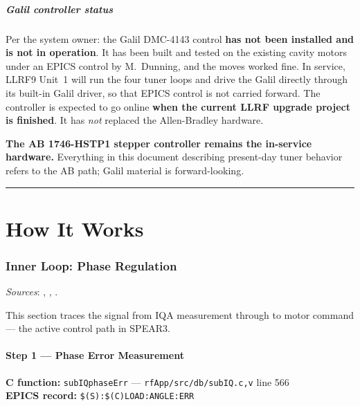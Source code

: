 \subsubsection{Galil controller status}\label{sec:galil-status}

\begin{warnbox}
Per the system owner: the Galil DMC-4143 control \textbf{has not been installed and is not in operation}. It has been built and tested on the existing cavity motors under an EPICS control by M.~Dunning, and the moves worked fine. In service, LLRF9 Unit~1 will run the four tuner loops and drive the Galil directly through its built-in Galil driver, so that EPICS control is not carried forward. The controller is expected to go online \textbf{when the current LLRF upgrade project is finished}. It has \emph{not} replaced the Allen-Bradley hardware.

\textbf{The AB 1746-HSTP1 stepper controller remains the in-service hardware.} Everything in this document describing present-day tuner behavior refers to the AB path; Galil material is forward-looking.
\end{warnbox}

\begin{center}\rule{0.5\linewidth}{0.5pt}\end{center}

\part{How It Works}

\section{Inner Loop: Phase Regulation}\label{sec:inner-loop}

\emph{Sources}: , , .


This section traces the signal from IQA measurement through to motor command --- the active control path in SPEAR3.

\subsection{Step 1 --- Phase Error Measurement}\label{sec:inner-step1}


\textbf{C function:} \texttt{subIQphaseErr} --- \texttt{rfApp/\allowbreak{}src/\allowbreak{}db/\allowbreak{}subIQ.\allowbreak{}c,\allowbreak{}v} line 566 \\
\textbf{EPICS record:} \texttt{\$(S):\allowbreak{}\$(C)LOAD:\allowbreak{}ANGLE:\allowbreak{}ERR}

